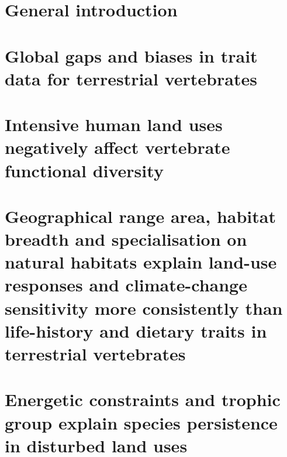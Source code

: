 \documentclass[11pt]{report}
\begin{document}
\begin{refsection}
\begin{itemize}
\end{itemize}





\clearpage
\tableofcontents

\clearpage
\listoftables

\clearpage
\listoffigures


\linenumbers

\clearpage
\chapter{General introduction}



\chapter{Global gaps and biases in trait data for terrestrial vertebrates}


\chapter{Intensive human land uses negatively affect vertebrate functional diversity}


\chapter{Geographical range area, habitat breadth and specialisation on natural habitats explain land-use responses and climate-change sensitivity more consistently than life-history and dietary traits in terrestrial vertebrates}


\chapter{Energetic constraints and trophic group explain species persistence in disturbed land uses}



\end{refsection}
\end{document}
